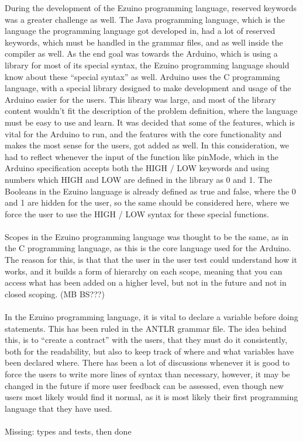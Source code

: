 During the development of the Ezuino programming language, reserved keywords was a greater challenge as well. The Java programming language, which is the language the programming language got developed in, had a lot of reserved keywords, which must be handled in the grammar files, and as well inside the compiler as well. As the end goal was towards the Arduino, which is using a library for most of its special syntax, the Ezuino programming language should know about these “special syntax” as well. Arduino uses the C programming language, with a special library designed to make development and usage of the Arduino easier for the users. This library was large, and most of the library content wouldn't fit the description of the problem definition, where the language must be easy to use and learn. It was decided that some of the features, which is vital for the Arduino to run, and the features with the core functionality and makes the most sense for the users, got added as well. In this consideration, we had to reflect whenever the input of the function like pinMode, which in the Arduino specification accepts both the HIGH / LOW keywords and using numbers which HIGH and LOW are defined in the library as 0 and 1. The Booleans in the Ezuino language is already defined as true and false, where the 0 and 1 are hidden for the user, so the same should be considered here, where we force the user to use the HIGH / LOW syntax for these special functions. \\\\
Scopes in the Ezuino programming language was thought to be the same, as in the C programming language, as this is the core language used for the Arduino. The reason for this, is that that the user in the user test could understand how it works, and it builds a form of hierarchy on each scope, meaning that you can access what has been added on a higher level, but not in the future and not in closed scoping. (MB BS???)  
\\\\
In the Ezuino programming language, it is vital to declare a variable before doing statements. This has been ruled in the ANTLR grammar file. The idea behind this, is to “create a contract” with the users, that they must do it consistently, both for the readability, but also to keep track of where and what variables have been declared where. There has been a lot of discussions whenever it is good to force the users to write more lines of syntax than necessary, however, it may be changed in the future if more user feedback can be assessed, even though new users most likely would find it normal, as it is most likely their first programming language that they have used.  
\\\\
Missing: types and tests, then done 

